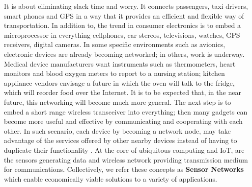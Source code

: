 	It is about eliminating slack time and worry.
	It connects passengers, taxi drivers, smart phones and GPS in a way that it provides an efficient and flexible way of transportation.
	In addition to, the trend in consumer electronics is to embed a microprocessor in everything-cellphones, car stereos,  televisions, watches, GPS receivers, digital cameras.
	In some specific environments such as avionics, electronic devices are already becoming networked; in others, work is underway.
	Medical device manufacturers want instruments such as thermometers, heart monitors and blood oxygen meters to report to a nursing station; kitchen appliance vendors envisage a future in which the oven will talk to the fridge, which will reorder food over the Internet. 
	It is to be expected that, in the near future, this networking will become much more general.
	The next step is to embed a short range wireless transceiver into everything; then many gadgets can become more useful and effective by communicating and cooperating with each other.
	In such scenario, each device by becoming a network node, may take advantage of the services offered by other nearby devices instead of having to duplicate their functionality \cite{2002-Stajano-ubiquitous}.
	At the core of ubiquitous computing and IoT, are the sensors generating data and wireless network providing transmission medium for communications. 
	Collectively, we refer these concepts as \textbf{Sensor Networks} which enable economically viable solutions to a variety of applications.


